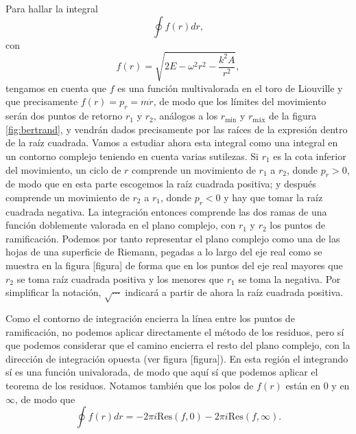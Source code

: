 \documentclass[12pt,a4paper,twoside]{article}
\theoremstyle{definition} \newtheorem{defn}[thm]{Definición}
\theoremstyle{definition} \newtheorem{ejemplo}[thm]{Ejemplo}
\theoremstyle{definition} \newtheorem{ejercicio}[thm]{Ejercicio}
\theoremstyle{remark} \newtheorem*{obs}{Observación}
\begin{document}
Para hallar la integral
\begin{equation*}
  \oint f(r)dr, 
\end{equation*}
con
\begin{equation}
f(r)=\sqrt{2E-\omega^2r^2-\frac{k^2A}{r^2}},
\end{equation}
tengamos en cuenta que $f$ es una función multivalorada en el toro de Liouville y que precisamente $f(r)=p_r=m\dot{r}$, de modo que los límites del movimiento serán dos puntos de retorno $r_1$ y $r_2$, análogos a los $r_{\text{min}}$ y $r_{\text{máx}}$ de la figura \ref{fig:bertrand}, y vendrán dados precisamente por las raíces de la expresión dentro de la raíz cuadrada. Vamos a estudiar ahora esta integral como una integral en un contorno complejo teniendo en cuenta varias sutilezas. Si $r_1$ es la cota inferior del movimiento, un ciclo de $r$ comprende un movimiento de $r_1$ a $r_2$, donde $p_r>0$, de modo que en esta parte escogemos la raíz cuadrada positiva; y después comprende un movimiento de $r_2$ a $r_1$, donde $p_r<0$ y hay que tomar la raíz cuadrada negativa. La integración entonces comprende las dos ramas de una función doblemente valorada en el plano complejo, con $r_1$ y $r_2$ los puntos de ramificación. Podemos por tanto representar el plano complejo como una de las hojas de una superficie de Riemann, pegadas a lo largo del eje real como se muestra en la figura [figura] de forma que en los puntos del eje real mayores que $r_2$ se toma raíz cuadrada positiva y los menores que $r_1$ se toma la negativa. Por simplificar la notación, $\sqrt{\cdots}$ indicará a partir de ahora la raíz cuadrada positiva. 

Como el contorno de integración encierra la línea entre los puntos de ramificación, no podemos aplicar directamente el método de los residuos, pero sí que podemos considerar que el camino encierra el resto del plano complejo, con la dirección de integración opuesta (ver figura [figura]). En esta región el integrando sí es una función univalorada, de modo que aquí sí que podemos aplicar el teorema de los residuos. Notamos también que los polos de $f(r)$ están en $0$ y en $\infty$, de modo que
\begin{equation}
  \oint f(r)dr =-2\pi i \mathrm{Res}(f,0) -2\pi i \mathrm{Res}(f,\infty).
\end{equation}
\end{document}
